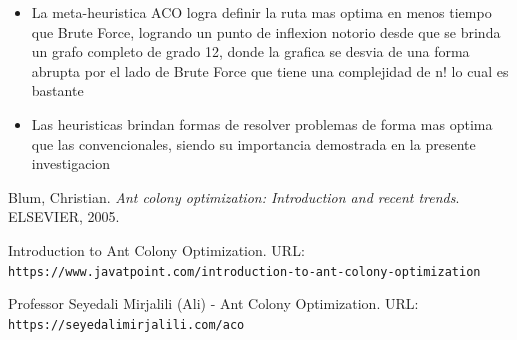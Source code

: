 \documentclass[12pt]{article}
\begin{document}
\begin{itemize}
    \item La meta-heuristica ACO logra definir la ruta mas optima en menos tiempo que Brute Force, logrando un punto de inflexion notorio
        desde que se brinda un grafo completo de grado 12, donde la grafica se desvia de una forma abrupta por el lado de Brute Force que tiene una complejidad de n! lo cual es bastante
    \item Las heuristicas brindan formas de resolver problemas de forma mas optima que las convencionales, siendo su importancia demostrada en la presente investigacion
\end{itemize}

\begin{thebibliography}{9}
    Blum, Christian. \textit{Ant colony optimization: Introduction and recent trends}. ELSEVIER, 2005.

    Introduction to Ant Colony Optimization. URL: \texttt{https://www.javatpoint.com/introduction-to-ant-colony-optimization}
    
    Professor Seyedali Mirjalili (Ali) - Ant Colony Optimization. URL: \texttt{https://seyedalimirjalili.com/aco}

\end{thebibliography}
\end{document}
